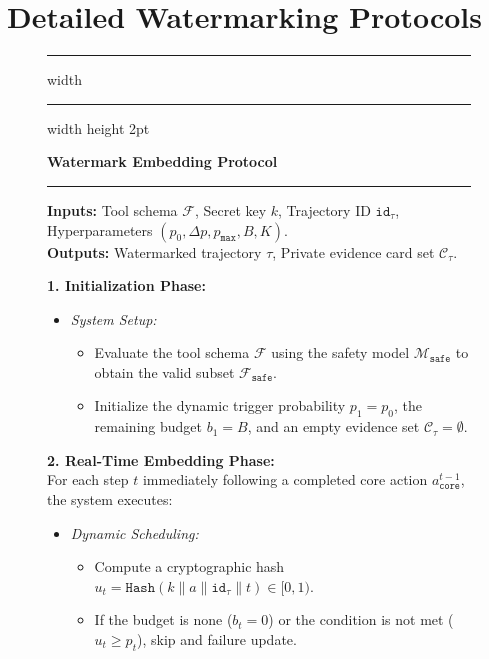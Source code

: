 \section{Detailed Watermarking Protocols}

\begin{figure}[!t]
\hrule width \hsize \kern 1mm \hrule width \hsize height 2pt 

\textbf{\name{} Watermark Embedding Protocol}

\hrule

\small
\textbf{Inputs:} Tool schema $\mathcal{F}$, Secret key $k$, Trajectory ID $\mathtt{id}_\tau$, Hyperparameters $(p_0, \Delta p, p_{\mathtt{max}}, B, K)$. \\
\textbf{Outputs:} Watermarked trajectory $\tau$, Private evidence card set $\mathcal{C}_\tau$.


\noindent \textbf{1. Initialization Phase:} 
\begin{itemize}
    \item \textit{System Setup:} 
    \begin{itemize}
        \item Evaluate the tool schema $\mathcal{F}$ using the safety model $\mathcal{M}_{\mathtt{safe}}$ to obtain the valid subset $\mathcal{F}_{\mathtt{safe}}$.
        \item Initialize the dynamic trigger probability $p_1 = p_0$, the remaining budget $b_1 = B$, and an empty evidence set $\mathcal{C}_\tau = \emptyset$.
    \end{itemize}
\end{itemize}

\noindent \textbf{2. Real-Time Embedding Phase:} \\
For each step $t$ immediately following a completed core action $a_{\mathtt{core}}^{t-1}$, the system executes:
\begin{itemize}
    \item \textit{Dynamic Scheduling:}
    \begin{itemize}
        \item Compute a cryptographic hash $u_t = \mathtt{Hash}(k \parallel a \parallel \mathtt{id}_\tau \parallel t) \in [0, 1)$.
        \item If the budget is none ($b_t = 0$) or the condition is not met ($u_t \ge p_t$), skip and failure update.
    \end{itemize}
    

\end{itemize}
\end{figure}
